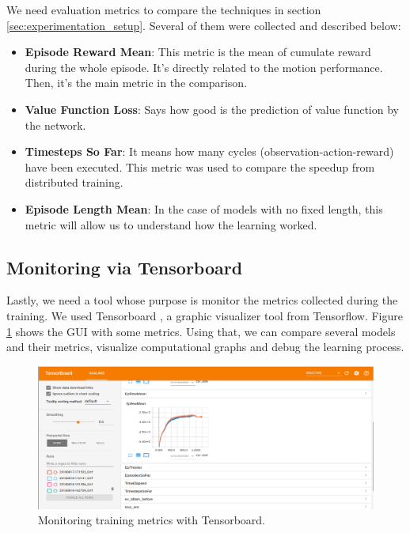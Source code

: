 We need evaluation metrics to compare the techniques in section \ref{sec:experimentation_setup}. Several of them were collected and described below:

\begin{itemize}
	\item \textbf{Episode Reward Mean}: This metric is the mean of cumulate reward during the whole episode. It's directly related to the motion performance. Then, it's the main metric in the comparison.
	\item \textbf{Value Function Loss}: Says how good is the prediction of value function by the network.
	\item \textbf{Timesteps So Far}: It means how many cycles (observation-action-reward) have been executed. This metric was used to compare the speedup from distributed training.
	\item \textbf{Episode Length Mean}: In the case of models with no fixed length, this metric will allow us to understand how the learning worked.
\end{itemize} 

\subsection{Monitoring via Tensorboard}
Lastly, we need a tool whose purpose is monitor the metrics collected during the training. We used Tensorboard \cite{tensorboard}, a graphic visualizer tool from Tensorflow. Figure \ref{fig:tensorboard} shows the GUI with some metrics. Using that, we can compare several models and their metrics, visualize computational graphs and debug the learning process.

\begin{figure}[!htbp]
	\centering
	\includegraphics[width=1.0\textwidth]{Cap5/tensorboard.eps}
	\caption{ Monitoring training metrics with Tensorboard.
	}
	\label{fig:tensorboard}
\end{figure}